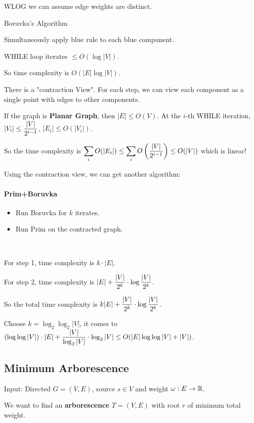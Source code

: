 WLOG we can assume edge weights are distinct.
\begin{algorithm}
    \caption{Boruvka's Algorithm}
    \label{alg:Boruvka}
    \begin{algorithmic}[1]
            \STATE Simultaneously apply blue rule to each blue compunent.
        \ENDWHILE
    \end{algorithmic}
\end{algorithm}

\begin{claim}
    WHILE loop iterates  $  \leq O(\log|V|) $.
    
    So time complexity is  $ O(|E|\log|V|) $. 
\end{claim}

\begin{remark}
    There is a "contraction View". For each step, we can view each component as a single point with edges to other components.

    If the graph is \textbf{Planar Graph}, then  $ |E| \leq O(V) $. At the  $ i $-th WHILE iteration,   $ |V_i| \leq \displaystyle\frac{|V|}{2^{i-1}} $,  $ |E_i| \leq O(|V_i|) $. 
    
    So the time complexity is  $ \displaystyle\sum_{i}O(|E_i|) \leq \sum_i O\left(\displaystyle\frac{|V|}{2^{i-1}}\right) \leq O(|V|) $ which is linear! 
\end{remark}
Using the contraction view, we can get another algorithm:

\paragraph{Prim+Boruvka} 
\begin{itemize}
    \item Run Boruvka for  $ k $ iterates.
    \item Run Prim on the contracted graph.
\end{itemize}

\begin{remark}
    \,

    For step 1, time  complexity is  $ k\cdot|E| $.

    For step 2, time complexity is   $ |E|+\displaystyle\frac{|V|}{2^k}\cdot\log\frac{|V|}{2^k} $.

    So the total time complexity is  $ k|E|+\displaystyle\frac{|V|}{2^k}\cdot\log\frac{|V|}{2^k} $.

    Choose  $ k=\log_2\log_2|V| $, it  comes to  $ (\log\log|V|)\cdot |E|+\displaystyle\frac{|V|}{\log_2|V|}\cdot\log_2|V| \leq O(|E|\log\log|V|+|V|) $.
\end{remark}

\subsection{Minimum Arborescence}
\begin{example}
    Input: Directed  $ G=(V,E) $, source  $ s\in V $ and weight  $ \omega:E\rightarrow\mathbb R $. 
    
    We want to find an \textbf{arborescence} $ T=(V,E) $ with root  $ r $ of  minimum total weight.
\end{example}

